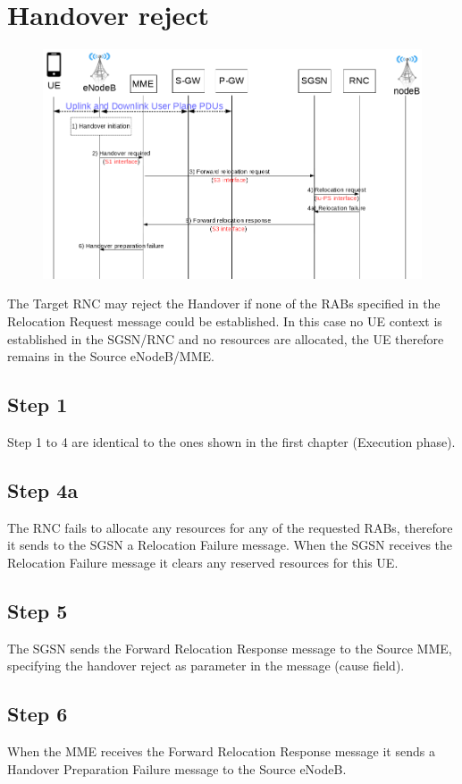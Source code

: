 \section{Handover reject}
\begin{figure}[htb]
	\centering
	\includegraphics[width=1\linewidth]{img/handover-reject.png}
	\label{fig:preparation-phase}
\end{figure}

The Target RNC may reject the Handover if none of the RABs specified in the
Relocation Request message could be established. In this case no UE context is
established in the SGSN/RNC and no resources are allocated, the UE therefore
remains in the Source eNodeB/MME.



\subsection*{Step 1}
Step 1 to 4 are identical to the ones shown in the first chapter (Execution phase).



\subsection*{Step 4a}
The RNC fails to allocate any resources for any of the requested RABs, therefore
it sends to the SGSN a Relocation Failure message. When the SGSN receives the
Relocation Failure message it clears any reserved resources for this UE.



\subsection*{Step 5}
The SGSN sends the Forward Relocation Response message to the Source MME, specifying
the handover reject as parameter in the message (cause field).



\subsection*{Step 6}
When the MME receives the Forward Relocation Response message it sends a Handover
Preparation Failure message to the Source eNodeB.
